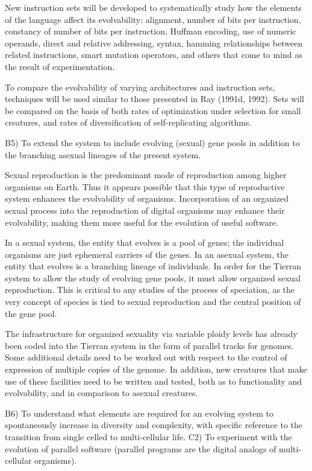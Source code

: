 New instruction sets will be developed to systematically study how the
elements of the language affect its evolvability: alignment, number of bits
per instruction, constancy of number of bits per instruction, Huffman encoding,
use of numeric operands, direct and relative addressing, syntax, hamming
relationships between related instructions, smart mutation operators, and
others that come to mind as the result of experimentation. 

To compare the evolvability of varying architectures and instruction sets,
techniques will be used similar to those presented in Ray (1991d, 1992).  Sets
will be compared on the basis of both rates of optimization under selection
for small creatures, and rates of diversification of self-replicating
algorithms.

\XP
B5) To extend the system to include evolving (sexual) gene pools in addition
to the branching asexual lineages of the present system.
\eXP

Sexual reproduction is the predominant mode of reproduction among higher
organisms on Earth.  Thus it appears possible that this type of reproductive
system enhances the evolvability of organisms.  Incorporation of an organized
sexual process into the reproduction of digital organisms may enhance their
evolvability, making them more useful for the evolution of useful software.

In a sexual system, the entity that evolves is a pool of genes; the individual
organisms are just ephemeral carriers of the genes.  In an asexual system,
the entity that evolves is a branching lineage of individuals.  In order for
the Tierran system to allow the study of evolving gene pools, it must allow
organized sexual reproduction.  This is critical to any studies of the process
of speciation, as the very concept of species is tied to sexual reproduction
and the central position of the gene pool.

The infrastructure for organized sexuality via variable ploidy levels has
already been coded into the Tierran system in the form of parallel tracks
for genomes.  Some additional details need to be worked out with respect to
the control of expression of multiple copies of the genome.  In addition,
new creatures that make use of these facilities need to be written and tested,
both as to functionality and evolvability, and in comparison to asexual
creatures.

\XP
B6) To understand what elements are required for an evolving system to
spontaneously increase in diversity and complexity, with specific reference
to the transition from single celled to multi-cellular life.
C2) To experiment with the evolution of parallel software (parallel
programs are the digital analogs of multi-cellular organisms).
\eXP

